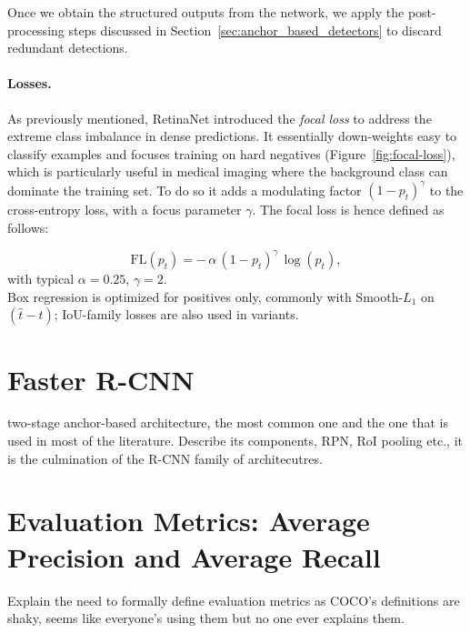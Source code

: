 Once we obtain the structured outputs from the network, we apply the post-processing steps discussed 
in Section~\ref{sec:anchor_based_detectors} to discard redundant detections.

\paragraph{Losses.}
As previously mentioned, RetinaNet introduced the \emph{focal loss} to address the extreme class imbalance in dense predictions.
It essentially down-weights easy to classify examples and focuses training on hard negatives (Figure~\ref{fig:focal-loss}), which is particularly useful in medical imaging where the background class can dominate the training set. To do so it adds a modulating factor $(1-p_t)^\gamma$ to the cross-entropy loss, with a focus parameter $\gamma$. The focal loss is hence defined as follows:

$$
\mathrm{FL}(p_t) = -\,\alpha\,(1-p_t)^{\gamma}\,\log(p_t),
$$
with typical $\alpha{=}0.25$, $\gamma{=}2$.\\



Box regression is optimized for positives only, commonly with Smooth-$L_1$ on $(\hat{t}-t)$; IoU-family losses are also used in variants.


\section{Faster R-CNN}
two-stage anchor-based architecture, the most common one and the one that is used in most of the literature.
Describe its components, RPN, RoI pooling etc., it is the culmination of the R-CNN family of architecutres.


\section{Evaluation Metrics: Average Precision and Average Recall}
Explain the need to formally define evaluation metrics as COCO's definitions are shaky, seems like everyone's using them but no one ever explains them.

